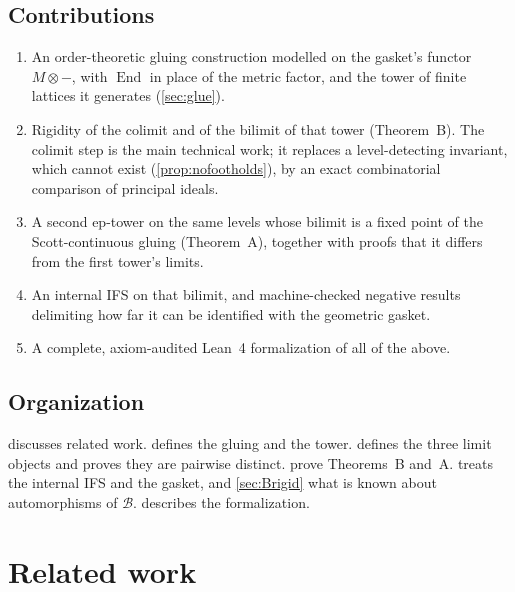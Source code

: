 \documentclass[11pt]{amsart}
\theoremstyle{plain}
\theoremstyle{definition}
\newcommand{\End}{\operatorname{End}}
\newcommand{\BB}{\mathcal{B}}
\begin{document}
\subsection*{Contributions}
\begin{enumerate}[leftmargin=2em]
\item An order-theoretic gluing construction modelled on the gasket's functor
  $M\otimes-$, with $\End$ in place of the metric factor, and the tower of
  finite lattices it generates (\cref{sec:glue}).
\item Rigidity of the colimit and of the bilimit of that tower (Theorem~B).
  The colimit step is the main technical work; it replaces a level-detecting
  invariant, which cannot exist (\cref{prop:nofootholds}), by an exact
  combinatorial comparison of principal ideals.
\item A second ep-tower on the same levels whose bilimit is a fixed point of
  the Scott-continuous gluing (Theorem~A), together with proofs that it differs
  from the first tower's limits.
\item An internal IFS on that bilimit, and machine-checked negative results
  delimiting how far it can be identified with the geometric gasket.
\item A complete, axiom-audited Lean~4 formalization of all of the above.
\end{enumerate}

\subsection*{Organization}
 discusses related work.  defines the gluing
and the tower.  defines the three limit objects and proves
they are pairwise distinct.  prove Theorems~B and~A.
 treats the internal IFS and the gasket, and \cref{sec:Brigid}
what is known about automorphisms of $\BB$.  describes the
formalization.

\section{Related work}\label{sec:related}
\end{document}
